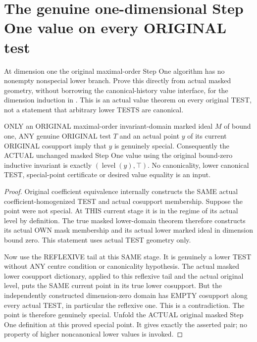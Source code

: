 \section{The genuine one-dimensional Step One value on every ORIGINAL test}

At dimension one the original maximal-order Step One algorithm has no
nonempty nonspecial lower branch. Prove this directly from actual masked
geometry, without borrowing the canonical-history value interface, for the
dimension induction in \cite[Section~5]{bierstone-milman08-functoriality}.
This is an actual value theorem on every original TEST, not a statement
that arbitrary lower TESTS are canonical.

\begin{theorem}
\label{hir:original-any-test-curve-stepone-special-value}
\leanok
ONLY an ORIGINAL maximal-order invariant-domain marked ideal $M$ of bound
one, ANY genuine ORIGINAL test $T$ and an actual point $y$ of its current
ORIGINAL cosupport imply that $y$ is genuinely special. Consequently the
ACTUAL unchanged masked Step One value using the original bound-zero
inductive invariant is exactly $(\operatorname{level}(y),\top)$.
No canonicality, lower canonical TEST, special-point certificate or desired
value equality is an input.
\end{theorem}
\begin{proof}
Original coefficient equivalence internally constructs the SAME actual
coefficient-homogenized TEST and actual cosupport membership. Suppose the
point were not special. At THIS current stage it is in the regime of its
actual level by definition. The true masked lower-domain theorem therefore
constructs its actual OWN mask membership and its actual lower marked ideal
in dimension bound zero. This statement uses actual TEST geometry only.

Now use the REFLEXIVE tail at this SAME stage. It is genuinely a lower
TEST without ANY centre condition or canonicality hypothesis. The actual
masked lower cosupport dictionary, applied to this reflexive tail and the
actual original level, puts the SAME current point in its true lower
cosupport. But the independently constructed dimension-zero domain has
EMPTY cosupport along every actual TEST, in particular the reflexive one.
This is a contradiction. The point is therefore genuinely special.
Unfold the ACTUAL original masked Step One definition at this proved
special point. It gives exactly the asserted pair; no property of higher
noncanonical lower values is invoked.
\end{proof}

